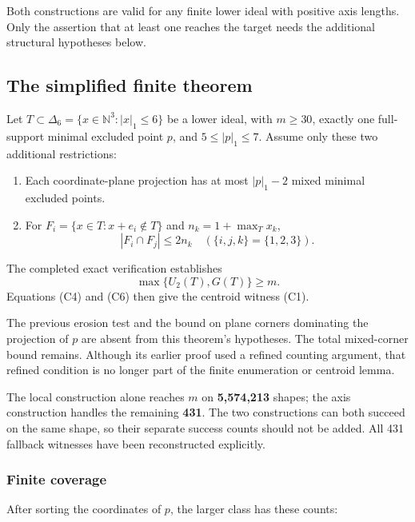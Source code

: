 \documentclass[
  11pt,
  a4paper,
]{article}
\providecommand{\tightlist}{%
  \setlength{\itemsep}{0pt}\setlength{\parskip}{0pt}}
\begin{document}
Both constructions are valid for any finite lower ideal with positive
axis lengths. Only the assertion that at least one reaches the target
needs the additional structural hypotheses below.

\hypertarget{the-simplified-finite-theorem}{%
\subsection{The simplified finite
theorem}\label{the-simplified-finite-theorem}}

Let \(T\subset\Delta_6=\{x\in\mathbb N^3:|x|_1\le6\}\) be a lower ideal,
with \(m\ge30\), exactly one full-support minimal excluded point \(p\),
and \(5\le|p|_1\le7\). Assume only these two additional restrictions:

\begin{enumerate}
\def\labelenumi{\arabic{enumi}.}
\tightlist
\item
  Each coordinate-plane projection has at most \(|p|_1-2\) mixed minimal
  excluded points.
\item
  For \(F_i=\{x\in T:x+e_i\notin T\}\) and \(n_k=1+\max_Tx_k\), \[
  |F_i\cap F_j|\le2n_k
  \quad(\{i,j,k\}=\{1,2,3\}).
  \]
\end{enumerate}

The completed exact verification establishes \[
\boxed{\max\{U_2(T),G(T)\}\ge m.}
\tag{C7}
\] Equations (C4) and (C6) then give the centroid witness (C1).

The previous erosion test and the bound on plane corners dominating the
projection of \(p\) are absent from this theorem's hypotheses. The total
mixed-corner bound remains. Although its earlier proof used a refined
counting argument, that refined condition is no longer part of the
finite enumeration or centroid lemma.

The local construction alone reaches \(m\) on \textbf{5,574,213} shapes;
the axis construction handles the remaining \textbf{431}. The two
constructions can both succeed on the same shape, so their separate
success counts should not be added. All 431 fallback witnesses have been
reconstructed explicitly.

\hypertarget{finite-coverage}{%
\subsubsection{Finite coverage}\label{finite-coverage}}

After sorting the coordinates of \(p\), the larger class has these
counts:
\end{document}
